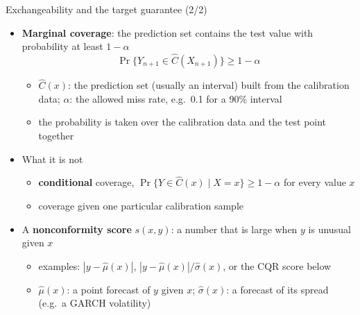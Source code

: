 \begin{frame}{Exchangeability and the target guarantee (2/2)}
\itemsize{\small}
\begin{itemize}
    \item \textbf{Marginal coverage}: the prediction set contains the test value with probability at least $1 - \alpha$ \[ \Pr\{Y_{n+1} \in \hat C(X_{n+1})\} \ge 1 - \alpha \]
    \begin{itemize}
        \item $\hat C(x)$: the prediction set (usually an interval) built from the calibration data; $\alpha$: the allowed miss rate, e.g.\ 0.1 for a 90\% interval
        \item the probability is taken over the calibration data and the test point together
    \end{itemize}
    \item What it is not
    \begin{itemize}
        \item \textbf{conditional} coverage, $\Pr\{Y \in \hat C(x) \mid X = x\} \ge 1 - \alpha$ for every value $x$
        \item coverage given one particular calibration sample
    \end{itemize}
    \item A \textbf{nonconformity score} $s(x, y)$: a number that is large when $y$ is unusual given $x$
    \begin{itemize}
        \item examples: $|y - \hat\mu(x)|$, $|y - \hat\mu(x)|/\hat\sigma(x)$, or the CQR score below
        \item $\hat\mu(x)$: a point forecast of $y$ given $x$; $\hat\sigma(x)$: a forecast of its spread (e.g.\ a GARCH volatility)
    \end{itemize}
\end{itemize}
\end{frame}

